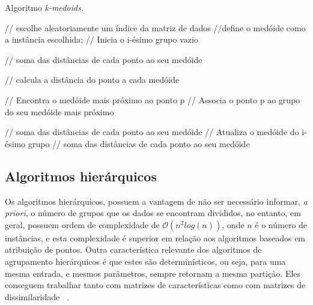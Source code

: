 \begin{algorithm}
	\caption{Algoritmo \emph{k-medoids}.}
	\label{alg:k_medoids}
	\begin{algorithmic}[1]
		
		 // escolhe aleatoriamente um índice da matriz de dados
		 //define o medóide como a instância escolhida;
		 // Inicia o i-ésimo grupo vazio
		\ENDFOR
		
		\STATE{$\phi \leftarrow \epsilon $}	// soma das distâncias de cada ponto ao seu medóide
		
		\WHILE{$\phi \geq \epsilon$}	
		 // calcula a distância do ponto a cada medóide
		\ENDFOR
		
			// Encontra o medóide mais próximo ao ponto p
		 // Associa o ponto p ao grupo do seu medóide mais próximo			
		\ENDFOR
		
			// soma das distâncias de cada ponto ao seu medóide
		 // Atualiza o medóide do i-ésimo grupo
			// soma das distâncias de cada ponto ao seu medóide
		\ENDIF
		\ENDFOR
		\ENDFOR
		
		\ENDWHILE
		
	\end{algorithmic}
\end{algorithm}

\subsection{Algoritmos hierárquicos}

Os algoritmos hierárquicos, possuem a vantagem de não ser necessário informar, \emph{a priori}, o número de grupos que os dados se encontram divididos, no entanto, em geral, possuem ordem de complexidade de  $\mathcal{O}(n^2log(n))$, onde $n$ é o número de instâncias, e esta complexidade é superior em relação aos algoritmos baseados em atribuição de pontos. Outra característica relevante dos algoritmos de agrupamento hierárquicos é que estes são determinísticos, ou seja, para uma mesma entrada, e mesmos parâmetros, sempre retornam a mesma partição. Eles conseguem trabalhar tanto com matrizes de características como com matrizes de dissimilaridade ~\parencite[][245]{Ullman}.

